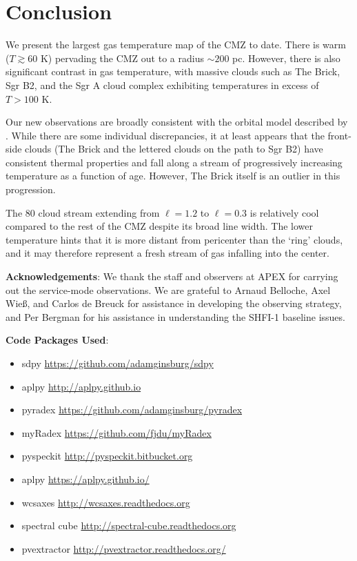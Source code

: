\section{Conclusion}
We present the largest gas temperature map of the CMZ to date.
There is warm ($T\gtrsim60$ K) pervading the CMZ out to a radius $\sim200$ pc.
However, there is also significant contrast in gas temperature, with massive
clouds such as The Brick, Sgr B2, and the Sgr A cloud complex exhibiting
temperatures in excess of $T>100$ K.

Our new observations are broadly consistent with the orbital model described by
\citet{Kruijssen2014d}.  While there are some individual discrepancies, it at
least appears that the front-side clouds (The Brick and the lettered clouds on
the path to Sgr B2) have consistent thermal properties and fall along a stream
of progressively increasing temperature as a function of age.  However, The
Brick itself is an outlier in this progression.

The 80 \kms cloud stream extending from $\ell=1.2$ to $\ell=0.3$ is relatively
cool compared to the rest of the CMZ despite its broad line width.  The lower
temperature hints that it is more distant from pericenter than the `ring'
clouds, and it may therefore represent a fresh stream of gas infalling into the
center.

\textbf{Acknowledgements}:
We thank the staff and observers at APEX for carrying out the service-mode
observations.  We are grateful to Arnaud Belloche, Axel Wieß, and Carlos de
Breuck for assistance in developing the observing strategy, and Per Bergman for
his assistance in understanding the SHFI-1 baseline issues.

\textbf{Code Packages Used}:

\begin{itemize}
    \item sdpy \url{https://github.com/adamginsburg/sdpy}
    \item aplpy \url{http://aplpy.github.io}
    \item pyradex \url{https://github.com/adamginsburg/pyradex}
    \item myRadex \url{https://github.com/fjdu/myRadex}
    \item pyspeckit \url{http://pyspeckit.bitbucket.org}
    \item aplpy \url{https://aplpy.github.io/}
    \item wcsaxes \url{http://wcsaxes.readthedocs.org}
    \item spectral cube \url{http://spectral-cube.readthedocs.org}
    \item pvextractor \url{http://pvextractor.readthedocs.org/}
\end{itemize}

